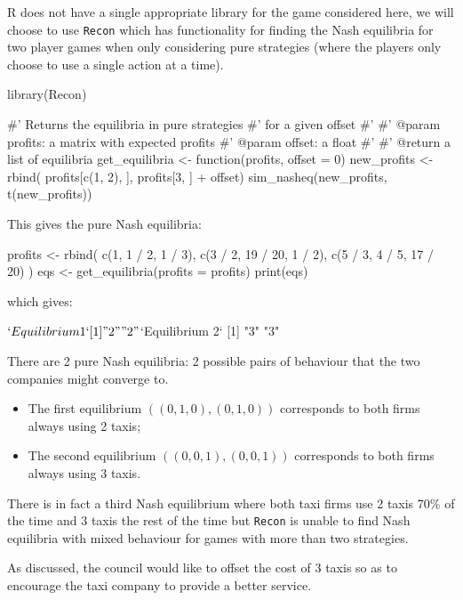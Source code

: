 R does not have a single appropriate library for the game considered here, we
will choose to use \texttt{Recon} which has functionality for finding the
Nash equilibria for two player games when only considering pure strategies
(where the players only choose to use a single action at a time).

\begin{Rin}
library(Recon)

#' Returns the equilibria in pure strategies
#' for a given offset
#'
#' @param profits: a matrix with expected profits
#' @param offset: a float
#'
#' @return a list of equilibria
get_equilibria <- function(profits, offset = 0){
    new_profits <- rbind(
                profits[c(1, 2), ],
                profits[3, ] + offset)
    sim_nasheq(new_profits, t(new_profits))
}
\end{Rin}


This gives the pure Nash equilibria:

\begin{Rin}

profits <- rbind(
        c(1, 1 / 2, 1 / 3),
        c(3 / 2, 19 / 20, 1 / 2),
        c(5 / 3, 4 / 5, 17 / 20)
    )
eqs <- get_equilibria(profits = profits)
print(eqs)
\end{Rin}

which gives:

\begin{Rout}
$`Equilibrium 1`
[1] "2" "2"

$`Equilibrium 2`
[1] "3" "3"

\end{Rout}

There are 2 pure Nash equilibria: 2 possible pairs of behaviour that the two
companies might converge to.

\begin{itemize}
    \item The first equilibrium \(((0, 1, 0), (0, 1, 0))\) corresponds to both
          firms always using 2 taxis;
    \item The second equilibrium \(((0, 0, 1), (0, 0, 1))\) corresponds to both
          firms always using 3 taxis.
\end{itemize}

There is in fact a third Nash equilibrium where both taxi firms use 2 taxis 70\%
of the time and 3 taxis the rest of the time but \texttt{Recon} is unable
to find Nash equilibria with mixed behaviour for games with more than two
strategies.

As discussed, the council would like to offset the cost of 3
taxis so as to encourage the taxi company to provide a better service.

